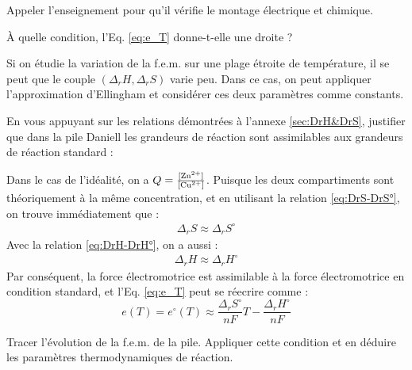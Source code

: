 \documentclass[twoside,a4paper,11pt,addpoints]{exam}%
\newcounter{foo} %
\begin{document}
\begin{questions}
\setcounter{question}{\thefoo}

\question[\half] Appeler l'enseignement pour qu'il vérifie le montage électrique et chimique.

\begin{mybox}
\bonusquestion[\half] \`{A} quelle condition, l'Eq. \ref{eq:e_T} donne-t-elle une droite ? 


\begin{solution}[2cm]
Si on étudie la variation de la f.e.m. sur une plage étroite de température, il se peut que le couple $(\Delta_r H, \Delta_r S)$ varie peu. Dans ce cas, on peut appliquer l'approximation d'Ellingham et considérer ces deux paramètres comme constants.
\end{solution}

\end{mybox}

\begin{mybox}
\bonusquestion[\half] En vous appuyant sur les relations démontrées à l'annexe \ref{sec:DrH&DrS}, justifier que dans la pile Daniell les grandeurs de réaction sont assimilables aux grandeurs de réaction standard : 


\begin{solution}[8cm]
Dans le cas de l'idéalité, on a $Q = \frac{[\ce{Zn^{2+}}]}{[\ce{Cu^{2+}}]}$. Puisque les deux compartiments sont théoriquement à la même concentration, et en utilisant la relation \ref{eq:DrS-DrS°}, on trouve immédiatement que :
\begin{align*}
\Delta_r S \approx \Delta_r S^\circ
\end{align*}
Avec la relation \ref{eq:DrH-DrH°}, on a aussi : 
\begin{align*}
\Delta_r H \approx \Delta_r H^\circ
\end{align*}
Par conséquent, la force électromotrice est assimilable à la force électromotrice en condition standard, et l'Eq. \ref{eq:e_T} peut se réecrire comme : 
\begin{equation}
e (T) = e^\circ (T) \approx \frac{\Delta_r S^\circ}{nF} T - \frac{\Delta_r H^\circ}{nF} 
\end{equation}

\end{solution}

\end{mybox}

\begin{mybox}
\bonusquestion[1\half] Tracer l'évolution de la f.e.m. de la pile. Appliquer cette condition et en déduire les paramètres thermodynamiques de réaction.



\end{mybox}
\end{questions}
\end{document}
